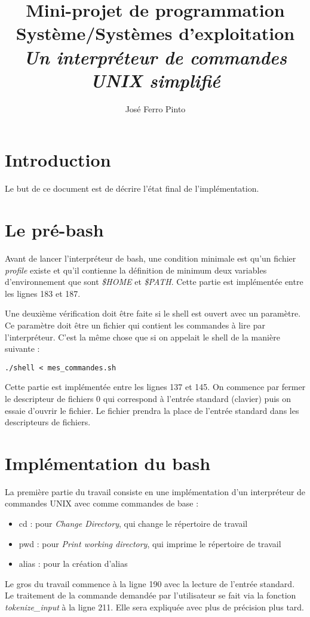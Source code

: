 \documentclass[a4paper,10pt]{article}
\title{Mini-projet de programmation Système/Systèmes d’exploitation\\
\large\emph{Un interpréteur de commandes UNIX simplifié}}
\author{José Ferro Pinto}
\begin{document}
\maketitle

\section{Introduction}
Le but de ce document est de décrire l'état final de l'implémentation.

\section{Le pré-bash}
Avant de lancer l'interpréteur de bash, une condition minimale est qu'un fichier \emph{profile} existe et qu'il contienne la définition de minimum deux variables d'environnement que sont \emph{\$HOME} et \emph{\$PATH}.
Cette partie est implémentée entre les lignes 183 et 187.

Une deuxième vérification doit être faite si le shell est ouvert avec un paramètre. Ce paramètre doit être un fichier qui contient les commandes à lire par l'interpréteur. C'est la même chose que si on appelait le shell de la manière suivante :

\verb?./shell < mes_commandes.sh?

Cette partie est implémentée entre les lignes 137 et 145.
On commence par fermer le descripteur de fichiers 0 qui correspond à l'entrée standard (clavier) puis on essaie d'ouvrir le fichier. Le fichier prendra la place de l'entrée standard dans les descripteurs de fichiers.

\section{Implémentation du bash}

La première partie du travail consiste en une implémentation d'un interpréteur de commandes UNIX avec comme commandes de base :
\begin{itemize}
	\item cd : pour \emph{Change Directory}, qui change le répertoire de travail
	\item pwd : pour \emph{Print working directory}, qui imprime le répertoire de travail
	\item alias : pour la création d'alias
\end{itemize}

Le gros du travail commence à la ligne 190 avec la lecture de l'entrée standard. Le traitement de la commande demandée par l'utilisateur se fait via la fonction \emph{tokenize\_input} à la ligne 211. Elle sera expliquée avec plus de précision plus tard.
\end{document}

